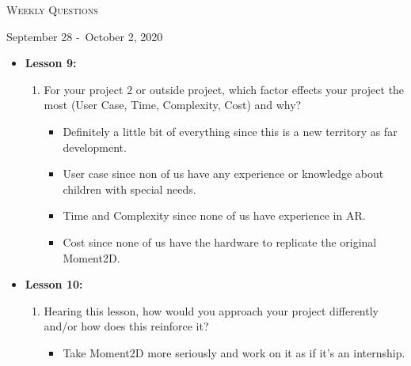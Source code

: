 \centerline{\LARGE\textsc{Weekly Questions}}
\centerline{September 28 -\ October 2, 2020}
\textbf{}
\begin{itemize}
  \item[] \textbf{\large Lesson 9:}
  \begin{enumerate}
    \item For your project 2 or outside project, which factor effects your project the most (User Case, Time, Complexity, Cost) and why?
    \begin{itemize}
      \item Definitely a little bit of everything since this is a new territory as far development. 
      \item User case since non of us have any experience or knowledge about children with special needs. 
      \item Time and Complexity since none of us have experience in AR.\
      \item Cost since none of us have the hardware to replicate the original Moment2D.
    \end{itemize}
  \end{enumerate} 
\end{itemize}
\begin{itemize}
  \item[] \textbf{\large Lesson 10:}
  \begin{enumerate}
    \item Hearing this lesson, how would you approach your project differently and/or how does this reinforce it?
    \begin{itemize}
      \item Take Moment2D more seriously and work on it as if it's an internship.
    \end{itemize}
  \end{enumerate} 
\end{itemize}
